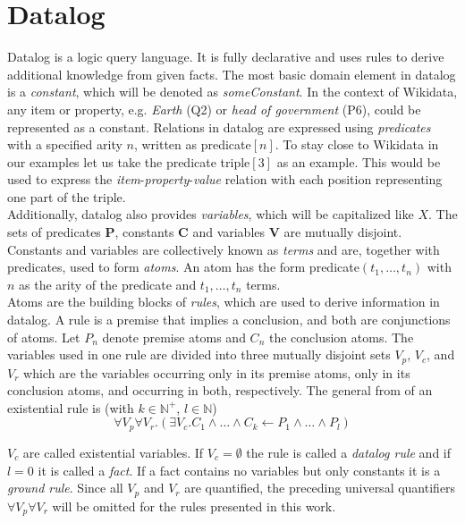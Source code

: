 \documentclass[hyperref,bachelorofscience,fleqn]{cgvpub}
\begin{document}
\section{Datalog}
Datalog is a logic query language. It is fully declarative and uses rules to derive additional knowledge from given facts. The most basic domain element in datalog is a \emph{constant}, which will be denoted as \emph{someConstant}. In the context of Wikidata, any item or property, e.g. \emph{Earth} (Q2) or \emph{head of government} (P6), could be represented as a constant. Relations in datalog are expressed using \emph{predicates} with a specified arity \(n\), written as predicate\([n]\). To stay close to Wikidata in our examples let us take the predicate triple\([3]\) as an example. This would be used to express the \emph{item}-\emph{property}-\emph{value} relation with each position representing one part of the triple.\\
Additionally, datalog also provides \emph{variables}, which will be capitalized like \(X\). The sets of predicates {\bf P}, constants {\bf C} and variables {\bf V} are mutually disjoint. Constants and variables are collectively known as \emph{terms} and are, together with predicates, used to form \emph{atoms}. An atom has the form predicate\((t_1, \ldots , t_n)\) with \(n\) as the arity of the predicate and \(t_1,\ldots,t_n\) terms.\\
Atoms are the building blocks of \emph{rules}, which are used to derive information in datalog. A rule is a premise that implies a conclusion, and both are conjunctions of atoms.
Let \(P_n\) denote  premise atoms and \(C_n\) the conclusion atoms. The variables used in one rule are divided into three mutually disjoint sets \(V_p\), \(V_c\), and \(V_r\) which are the variables occurring only in its premise atoms, only in its conclusion atoms, and occurring in both, respectively. The general from of an existential rule is (with \(k \in \mathbb{N}^+\), \(l \in \mathbb{N}\))
\begin{equation}
\forall V_p \forall V_r.(\exists V_c.C_1 \wedge \ldots \wedge C_k \leftarrow P_1 \wedge \ldots \wedge P_l)
\end{equation}

\(V_c\) are called existential variables. If \(V_c = \emptyset\) the rule is called a \emph{datalog rule} and if \(l = 0\) it is called a \emph{fact}. If a fact contains no variables but only constants it is a \emph{ground rule}. Since all \(V_p\) and \(V_r\) are  quantified, the preceding universal quantifiers \(\forall V_p \forall V_r\) will be omitted for the rules presented in this work.
\end{document}

